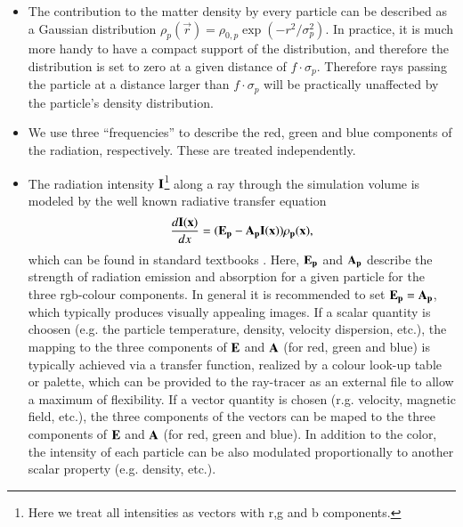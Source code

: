 \begin{itemize}
\item
The contribution to the matter density by every particle can
be described as a Gaussian distribution 
$\rho_p(\vec r)=\rho_{0,p}\exp(-r^2/\sigma_p^2)$.
In practice, it is much more handy to have a compact support of the
distribution, and therefore the distribution is set to zero at a given
distance of $f\cdot\sigma_p$. 
Therefore rays passing
the particle at a distance larger than $f\cdot\sigma_p$ will be practically
unaffected by the particle's density distribution.

\item 
We use three ``frequencies'' to describe the red, green and blue
components of the radiation, respectively. These are treated independently.

\item
The radiation intensity $\bf{I}$\footnote{Here we treat all
intensities as vectors with r,g and b components.} along a ray through the simulation
volume is modeled by the well known radiative transfer equation
\begin{equation}
\frac{d\bf{I}(x)}{dx}=(\bf{E}_p-\bf{A}_p\bf{I}(x))\rho_p(x),
\end{equation}
which can be found in standard textbooks \cite{1991par..book.....S}.
Here, $\bf{E}_p$ and $\bf{A}_p$ describe the strength of radiation emission and absorption
for a given particle for the three rgb-colour components. In general it is recommended to
set $\bf{E}_p=\bf{A}_p$, which typically produces visually appealing images.
If a scalar quantity is choosen (e.g. the particle temperature, 
density, velocity dispersion, etc.), the mapping to the three components of $\bf{E}$ and $\bf{A}$ (for red, green and blue)
is typically achieved via a transfer function, realized by a colour look-up table or palette, which can
be provided to the ray-tracer as an external file to allow a maximum of flexibility. If a
vector quantity is chosen (r.g. velocity, magnetic field, etc.), the three components of the vectors
can be maped to the three components of $\bf{E}$ and $\bf{A}$ (for red, green and blue). In addition 
to the color, the intensity of each particle can be also modulated proportionally to another
scalar property (e.g. density, etc.).
\end{itemize}


